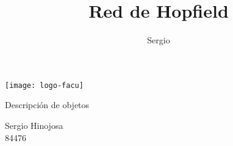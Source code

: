 \documentclass[12pt]{article}
\title{Red de Hopfield}
\author{Sergio}
\numberwithin{equation}{section}
\numberwithin{figure}{section}
\numberwithin{table}{section}
\begin{document}




\begin{titlepage}


\thispagestyle{empty}




	\texttt{[image: logo-facu]}

\vfill




\begin{center}
	\Huge{Descripción de objetos}\\

\end{center}

\vspace{4cm}




\large{

	\begin{tabbing}
		Sergio Hinojosa \hspace{1cm} \\84476 \\
	\end{tabbing}

}

\vfill



\end{titlepage}





\setcounter{page}{1}










\end{document}
